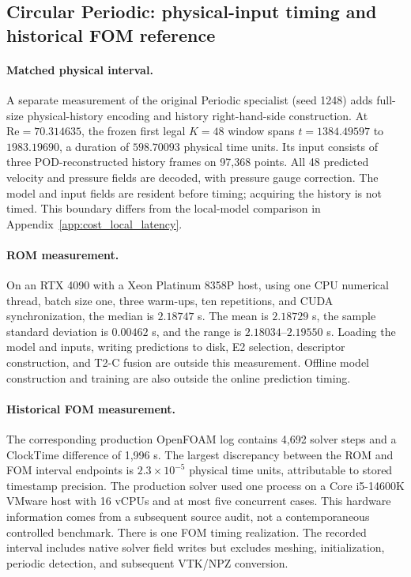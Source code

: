 \subsection{Circular Periodic: physical-input timing and historical FOM reference}
\label{app:cost_fom_reference}

\paragraph{Matched physical interval.}
A separate measurement of the original Periodic specialist (seed 1248)
adds full-size physical-history encoding and history right-hand-side
construction. At $\mathrm{Re}=70.314635$, the frozen first legal
$K=48$ window spans $t=1384.49597$ to $1983.19690$, a duration of
$598.70093$ physical time units. Its input consists of three
POD-reconstructed history frames on 97,368 points. All 48 predicted
velocity and pressure fields are decoded, with pressure gauge correction.
The model and input fields are resident before timing; acquiring the
history is not timed. This boundary differs from the local-model
comparison in Appendix~\ref{app:cost_local_latency}.

\paragraph{ROM measurement.}
On an RTX 4090 with a Xeon Platinum 8358P host, using one CPU numerical
thread, batch size one, three warm-ups, ten repetitions, and CUDA
synchronization, the median is $2.18747$ s. The mean is $2.18729$ s,
the sample standard deviation is $0.00462$ s, and the range is
$2.18034$--$2.19550$ s. Loading the model and inputs, writing predictions
to disk, E2 selection, descriptor construction, and T2-C fusion are
outside this measurement. Offline model construction and training are
also outside the online prediction timing.

\paragraph{Historical FOM measurement.}
The corresponding production OpenFOAM log contains 4,692 solver steps
and a ClockTime difference of 1,996 s. The largest discrepancy between
the ROM and FOM interval endpoints is $2.3\times10^{-5}$ physical time
units, attributable to stored timestamp precision. The production
solver used one process on a Core i5-14600K VMware host with 16 vCPUs
and at most five concurrent cases. This hardware information comes
from a subsequent source audit, not a contemporaneous controlled
benchmark. There is one FOM timing realization. The recorded interval
includes native solver field writes but excludes meshing, initialization,
periodic detection, and subsequent VTK/NPZ conversion.

